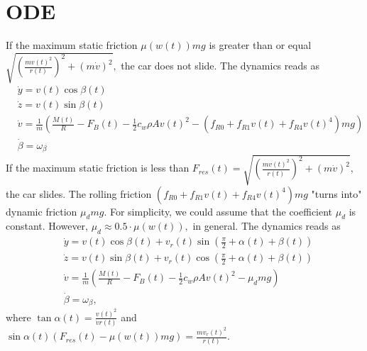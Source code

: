 \documentclass[
10pt, %
a4paper, %
oneside, %
headinclude,footinclude, %
BCOR5mm, %
]{scrartcl}
\begin{document}
\section{ODE}
If the maximum static friction $\mu(w(t)) m g$ is greater than or equal $\sqrt{\left(\frac{mv(t)^2}{r(t)}\right)^2+ \left(m \dot{v}\right)^2},$ the car does not slide. The dynamics reads as
\begin{align*}
 &\dot{y} = v(t) \cos\beta(t)\\
& \dot{z} = v(t) \sin\beta(t) \\
& \dot{v} = \frac{1}{m}\left( \frac{M(t)}{R} - F_B(t) - \frac{1}{2}  c_w  \rho  A v(t)^2 - \left(f_{R0} + f_{R1} v(t) + f_{R4}v(t)^4 \right) m g\right)\\
& \dot{\beta} = \omega_{\beta} 
\end{align*}
If the maximum static friction is less than $F_{res}(t) = \sqrt{\left(\frac{mv(t)^2}{r(t)}\right)^2+ \left(m \dot{v}\right)^2},$ the car slides. The rolling friction $\left(f_{R0} + f_{R1} v(t) + f_{R4}v(t)^4 \right) m g$ "turns into" dynamic friction $\mu_d m g.$ For simplicity, we could assume that the coefficient $\mu_d$ is constant. However, $\mu_d \approx 0.5 \cdot \mu(w(t)),$ in general.
The dynamics reads as
\begin{align*}
 &\dot{y} = v(t) \cos\beta(t) +  v_r(t)\sin ( \frac{\pi}{2}+\alpha(t) +\beta(t)) \\
& \dot{z} = v(t) \sin\beta(t) +  v_r(t)\cos ( \frac{\pi}{2}+\alpha(t) +\beta(t)) \\
& \dot{v} = \frac{1}{m}\left( \frac{M(t)}{R} - F_B(t) - \frac{1}{2}  c_w  \rho  A v(t)^2 - \mu_d m g\right)\\
& \dot{\beta} = \omega_{\beta},
\end{align*}
where $\tan \alpha(t) = \frac{v(t)^2}{\dot{v}r(t)}$ and $\sin \alpha(t)  (F_{res}(t) - \mu(w(t)) mg ) = \frac{m v_r(t)^2}{r(t)}.$ \par
\end{document}
